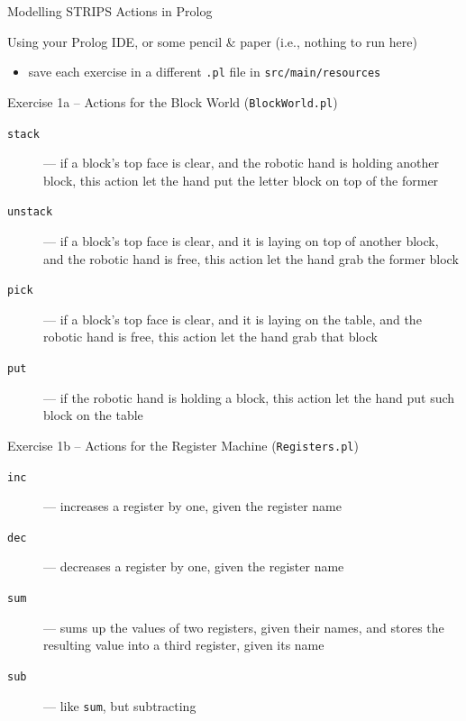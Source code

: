 \documentclass[presentation]{beamer}\mode<presentation>{\usetheme{AMSBolognaFC}}
\begin{document}
\begin{frame}[allowframebreaks]{Modelling STRIPS Actions in Prolog}

Using your Prolog IDE, or some pencil \& paper (i.e., nothing to run here)
%
\begin{itemize}
    \item save each exercise in a different \texttt{.pl} file in \texttt{src/main/\alert{resources}}
\end{itemize}

\begin{block}{Exercise 1a -- Actions for the Block World (\texttt{BlockWorld.pl})}
       \begin{description}
           \item[\texttt{stack}] --- if a block's top face is clear, and the robotic hand is holding another block, this action let the hand put the letter block on top of the former

           \item[\texttt{unstack}] --- if a block's top face is clear, and it is laying on top of another block, and the robotic hand is free, this action let the hand grab the former block

           \item[\texttt{pick}] --- if a block's top face is clear, and it is laying on the table, and the robotic hand is free, this action let the hand grab that block

           \item[\texttt{put}] --- if the robotic hand is holding a block, this action let the hand put such block on the table
       \end{description}
\end{block}

\begin{block}{Exercise 1b -- Actions for the Register Machine (\texttt{Registers.pl})}
       \begin{description}
           \item[\texttt{inc}] --- increases a register by one, given the register name
           \item[\texttt{dec}] --- decreases a register by one, given the register name
           \item[\texttt{sum}] --- sums up the values of two registers, given their names, and stores the resulting value into a third register, given its name
           \item[\texttt{sub}] --- like \texttt{sum}, but subtracting
       \end{description}
\end{block}


\end{frame}
\end{document}
